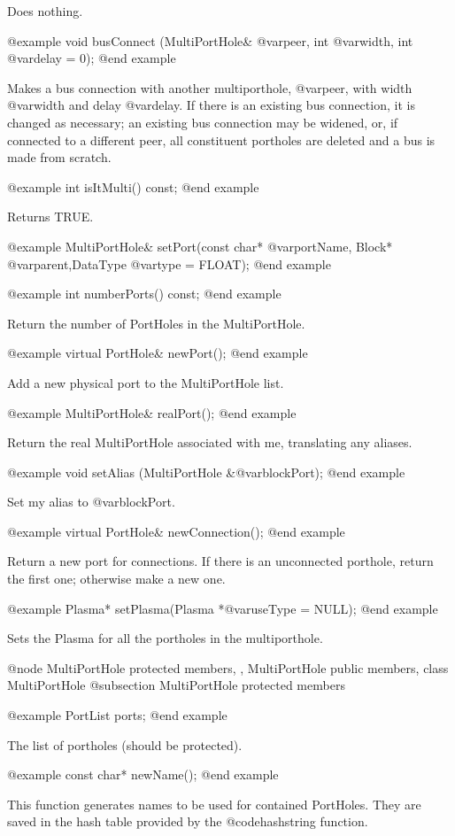 Does nothing.

@example
void busConnect (MultiPortHole& @var{peer}, int @var{width}, int @var{delay} = 0);
@end example

Makes a bus connection with another multiporthole, @var{peer}, with
width @var{width} and delay @var{delay}.  If there is an existing bus
connection, it is changed as necessary; an existing bus connection may
be widened, or, if connected to a different peer, all constituent
portholes are deleted and a bus is made from scratch.

@example
int isItMulti() const;
@end example

Returns TRUE.

@example
MultiPortHole& setPort(const char* @var{portName},
                       Block* @var{parent},DataType @var{type} = FLOAT);
@end example

@example
int numberPorts() const;
@end example

Return the number of PortHoles in the MultiPortHole.

@example
virtual PortHole& newPort();
@end example

Add a new physical port to the MultiPortHole list.

@example
MultiPortHole& realPort();
@end example

Return the real MultiPortHole associated with me, translating any
aliases.

@example
void setAlias (MultiPortHole &@var{blockPort});
@end example

Set my alias to @var{blockPort}.

@example
virtual PortHole& newConnection();
@end example

Return a new port for connections.  If there is an unconnected porthole,
return the first one; otherwise make a new one.

@example
Plasma* setPlasma(Plasma *@var{useType} = NULL);
@end example

Sets the Plasma for all the portholes in the multiporthole.

@node MultiPortHole protected members,  , MultiPortHole public members, class MultiPortHole
@subsection MultiPortHole protected members

@example
PortList ports;
@end example

The list of portholes (should be protected).

@example
const char* newName();
@end example

This function generates names to be used for contained PortHoles.  They
are saved in the hash table provided by the @code{hashstring} function.

